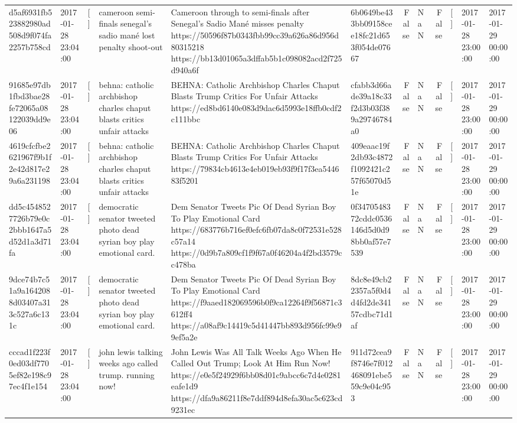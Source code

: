 \begin{tabular}{llllllrlrlll}
d5af6931fb523882980ad508d9f074fa2257b758cd & 2017-01-28 23:04:00 & [] & cameroon semi-finals senegal's sadio mané lost penalty shoot-out & Cameroon through to semi-finals after Senegal’s Sadio Mané misses penalty https://50596f87b0343fbb99cc39a626a86d956d80315218 https://bb13d01065a3dffab5b1c098082acd2f725d940a6f & 6b0649be433bb09158cee18fc21d653f054de07667 & False & NaN & False & [] & 2017-01-28 23:00:00 & 2017-01-29 00:00:00 \\
91685e97db1fbd3bae28fe72065a08122039dd9e06 & 2017-01-28 23:04:00 & [] & behna: catholic archbishop charles chaput blasts critics unfair attacks & BEHNA: Catholic Archbishop Charles Chaput Blasts Trump Critics For Unfair Attacks https://ed8bd6140e083d9dac6d5993e18ffb0cdf2c111bbc & cfabb3d66ade39a18c33f2d3b03f389a29746784a0 & False & NaN & False & [] & 2017-01-28 23:00:00 & 2017-01-29 00:00:00 \\
4619cfcfbe2621967f9b1f2e42d817e29a6a231198 & 2017-01-28 23:04:00 & [] & behna: catholic archbishop charles chaput blasts critics unfair attacks & BEHNA: Catholic Archbishop Charles Chaput Blasts Trump Critics For Unfair Attacks https://79834cb4613e4eb019eb93f9f17f3ea544683f5201 & 409eaac19f2db93c4872f1092421c257f65070d51e & False & NaN & False & [] & 2017-01-28 23:00:00 & 2017-01-29 00:00:00 \\
dd5c4548527726b79e0c2bbb1647a5d52d1a3d71fa & 2017-01-28 23:04:00 & [] & democratic senator tweeted photo dead syrian boy play emotional card. & Dem Senator Tweets Pic Of Dead Syrian Boy To Play Emotional Card https://683776b716ef0efc6fb07da8c0f72531e528c57a14 https://0d9b7a809cf1f9f67a0f46204a4f2bd3579cc478ba & 0f3470548372cddc0536146d5d0d98bb0af57e7539 & False & NaN & False & [] & 2017-01-28 23:00:00 & 2017-01-29 00:00:00 \\
9dce74b7c51a9a1642088d03407a313c527a6c131c & 2017-01-28 23:04:00 & [] & democratic senator tweeted photo dead syrian boy play emotional card. & Dem Senator Tweets Pic Of Dead Syrian Boy To Play Emotional Card https://f9aaed182069596b0f9ca12264f9f56871c3612ff4 https://a08af9c14419c5d41447bb893d956fc99e99ef5a2e & 8dc8e49cb22357a5f0d4d4fd2de34157cdbc71d1af & False & NaN & False & [] & 2017-01-28 23:00:00 & 2017-01-29 00:00:00 \\
cccad1f223f0ed03df7705ef82e198c97ec4f1e154 & 2017-01-28 23:04:00 & [] & john lewis talking weeks ago called trump. running now! & John Lewis Was All Talk Weeks Ago When He Called Out Trump; Look At Him Run Now! https://e0e5f24929f6bb08d01c9abcc6c7d4e0281eafe1d9 https://dfa9a86211f8e7ddf894d8efa30ac5c623cd9231ec & 911d72cea9f8746e7f012468091ebe559c9e04c953 & False & NaN & False & [] & 2017-01-28 23:00:00 & 2017-01-29 00:00:00 \\

\end{tabular}
